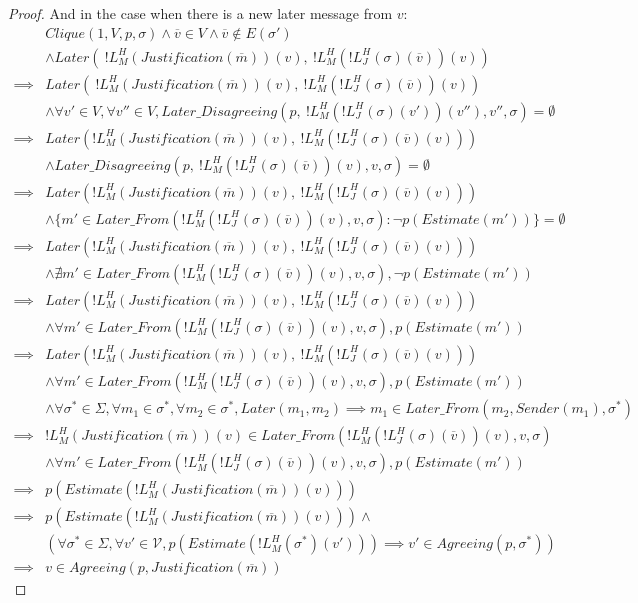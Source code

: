 \begin{proof}
And in the case when there is a new later message from $v$:
\begin{align}
        &Clique(1, V, p, \sigma) \land \overline{v} \in V \land \overline{v} \notin E(\sigma') \\
        &\land Later(~!L^H_M(Justification(\overline{m}))(v),~!L^H_M(!L^H_J(\sigma)(\overline{v}))(v)) \\
\implies& Later(~!L^H_M(Justification(\overline{m}))(v),~!L^H_M(!L^H_J(\sigma)(\overline{v}))(v)) \\
        &\land \forall v' \in V, \forall v'' \in V,Later\_Disagreeing(p,~!L^H_M(!L^H_J(\sigma)(v'))(v''), v'', \sigma) = \emptyset \\
\implies&Later(!L^H_M(Justification(\overline{m}))(v),~!L^H_M(!L^H_J(\sigma)(\overline{v})(v))) \\
        &\land Later\_Disagreeing(p,~!L^H_M(!L^H_J(\sigma)(\overline{v}))(v), v, \sigma) = \emptyset \\
\implies& Later(!L^H_M(Justification(\overline{m}))(v),~!L^H_M(!L^H_J(\sigma)(\overline{v})(v))) \\
        &\land \{m' \in Later\_From(!L^H_M(!L^H_J(\sigma)(\overline{v}))(v), v, \sigma) : \neg p(Estimate(m')) \}  = \emptyset \\
\implies& Later(!L^H_M(Justification(\overline{m}))(v),~!L^H_M(!L^H_J(\sigma)(\overline{v})(v))) \\
        &\land \nexists m' \in Later\_From(!L^H_M(!L^H_J(\sigma)(\overline{v}))(v), v, \sigma), \neg p(Estimate(m')) \\
\implies& Later(!L^H_M(Justification(\overline{m}))(v),~!L^H_M(!L^H_J(\sigma)(\overline{v})(v))) \\
        &\land \forall m' \in Later\_From(!L^H_M(!L^H_J(\sigma)(\overline{v}))(v), v, \sigma), p(Estimate(m')) \\
\implies& Later(!L^H_M(Justification(\overline{m}))(v),~!L^H_M(!L^H_J(\sigma)(\overline{v})(v))) \\
        &\land \forall m' \in Later\_From(!L^H_M(!L^H_J(\sigma)(\overline{v}))(v), v, \sigma), p(Estimate(m')) \\
        &\land \forall \sigma^* \in \Sigma, \forall m_1 \in \sigma^*, \forall m_2 \in \sigma^*, Later(m_1, m_2) \implies m_1 \in Later\_From(m_2, Sender(m_1), \sigma^*) \\
\implies&!L^H_M(Justification(\overline{m}))(v) \in Later\_From(!L^H_M(!L^H_J(\sigma)(\overline{v}))(v), v, \sigma) \\
        &\land \forall m' \in Later\_From(!L^H_M(!L^H_J(\sigma)(\overline{v}))(v), v, \sigma), p(Estimate(m')) \\
\implies&p(Estimate(!L^H_M(Justification(\overline{m}))(v))) \\
\implies&p(Estimate(!L^H_M(Justification(\overline{m}))(v))) \land \\
        &(\forall \sigma^* \in \Sigma, \forall v' \in \mathcal{V}, p(Estimate(!L^H_M(\sigma^*)(v'))) \implies v' \in Agreeing(p, \sigma^*)) \\
\implies&v \in Agreeing(p, Justification(\overline{m}))
\end{align}



\end{proof}
